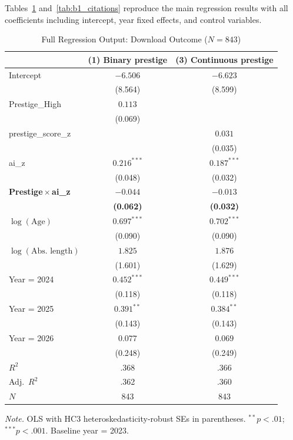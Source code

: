 \documentclass[12pt,a4paper]{article}
\begin{document}
Tables~\ref{tab:b1_downloads} and~\ref{tab:b1_citations} reproduce
the main regression results with all coefficients including intercept,
year fixed effects, and control variables.

\begin{table}[htbp]
\centering
\caption{Full Regression Output: Download Outcome ($N = 843$)}
\label{tab:b1_downloads}
\begin{threeparttable}
\small
\begin{tabular}{lcc}
\toprule
 & (1) Binary prestige & (3) Continuous prestige \\
\midrule
Intercept
  & $-6.506$ & $-6.623$ \\
  & (8.564)  & (8.599)  \\[3pt]
Prestige\_High
  & $0.113$ & \\
  & (0.069) & \\[3pt]
prestige\_score\_z
  & & $0.031$ \\
  & & (0.035) \\[3pt]
ai\_z
  & $0.216^{***}$ & $0.187^{***}$ \\
  & (0.048)       & (0.032)       \\[3pt]
\textbf{Prestige\,$\times$\,ai\_z}
  & $\mathbf{-0.044}$ & $\mathbf{-0.013}$ \\
  & \textbf{(0.062)}  & \textbf{(0.032)}  \\[3pt]
$\log(\text{Age})$
  & $0.697^{***}$ & $0.702^{***}$ \\
  & (0.090)       & (0.090)       \\[3pt]
$\log(\text{Abs.\ length})$
  & $1.825$ & $1.876$ \\
  & (1.601) & (1.629) \\[3pt]
Year = 2024
  & $0.452^{***}$ & $0.449^{***}$ \\
  & (0.118)       & (0.118)       \\[3pt]
Year = 2025
  & $0.391^{**}$ & $0.384^{**}$ \\
  & (0.143)      & (0.143)      \\[3pt]
Year = 2026
  & $0.077$ & $0.069$ \\
  & (0.248) & (0.249) \\[3pt]
\midrule
$R^2$       & .368 & .366 \\
Adj.\ $R^2$ & .362 & .360 \\
$N$         & 843  & 843  \\
\bottomrule
\end{tabular}
\begin{tablenotes}
\footnotesize
\item \textit{Note.} OLS with HC3 heteroskedasticity-robust SEs in parentheses.
  $^{**}p<.01$;\ $^{***}p<.001$.
  Baseline year = 2023.
\end{tablenotes}
\end{threeparttable}
\end{table}
\end{document}
